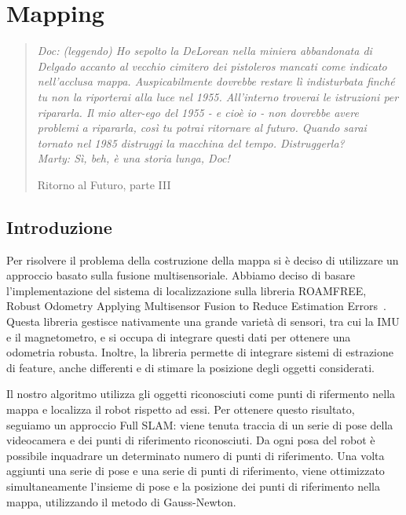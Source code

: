\chapter{Mapping}
\label{cap:mapping}
\thispagestyle{empty}

\begin{quotation}
{\footnotesize
\noindent\emph{Doc: (leggendo) Ho sepolto la DeLorean nella miniera abbandonata di Delgado accanto al vecchio cimitero dei pistoleros mancati come indicato nell'acclusa mappa. Auspicabilmente dovrebbe restare lì indisturbata finché tu non la riporterai alla luce nel 1955. All'interno troverai le istruzioni per ripararla. Il mio alter-ego del 1955 - e cioè io - non dovrebbe avere problemi a ripararla, così tu potrai ritornare al futuro. Quando sarai tornato nel 1985 distruggi la macchina del tempo. Distruggerla? \\
Marty: Sì, beh, è una storia lunga, Doc!}
\begin{flushright}
Ritorno al Futuro, parte III
\end{flushright}
}
\end{quotation}
\vspace{0.5cm}

\section{Introduzione}
Per risolvere il problema della costruzione della mappa si è deciso di utilizzare un approccio basato sulla fusione multisensoriale. Abbiamo deciso di basare l'implementazione del sistema di localizzazione sulla libreria ROAMFREE, Robust Odometry Applying Multisensor Fusion to Reduce Estimation Errors~\cite{conf/icinco/CucciM13}.
Questa libreria gestisce nativamente una grande varietà di sensori, tra cui la IMU e il magnetometro, e si occupa di integrare questi dati per ottenere una odometria robusta. Inoltre, la libreria permette di integrare sistemi di estrazione di feature, anche differenti e di stimare la posizione degli oggetti considerati.

Il nostro algoritmo utilizza gli oggetti riconosciuti come punti di rifermento nella mappa e localizza il robot rispetto ad essi. 
Per ottenere questo risultato, seguiamo un approccio Full SLAM: viene tenuta traccia di un serie di pose della videocamera e dei punti di riferimento riconosciuti. Da ogni posa del robot è possibile inquadrare un determinato numero di punti di riferimento. Una volta aggiunti una serie di pose e una serie di punti di riferimento, viene ottimizzato simultaneamente l'insieme di pose e la posizione dei punti di riferimento nella mappa, utilizzando il metodo di Gauss-Newton.

